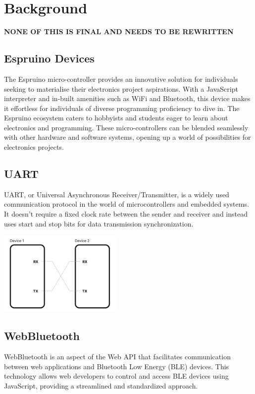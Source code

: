 \documentclass{l4proj}
\begin{document}
\chapter{Background}

\textbf{NONE OF THIS IS FINAL AND NEEDS TO BE REWRITTEN}

\section{Espruino Devices}
\text 
The Espruino micro-controller provides an innovative solution for individuals seeking to materialise their electronics project aspirations. With a JavaScript interpreter and in-built amenities such as WiFi and Bluetooth, this device makes it effortless for individuals of diverse programming proficiency to dive in. The Espruino ecosystem caters to hobbyists and students eager to learn about electronics and programming. These micro-controllers can be blended seamlessly with other hardware and software systems, opening up a world of possibilities for electronics projects.

    
\section{UART}
\text UART, or Universal Asynchronous Receiver/Transmitter, is a widely used communication protocol in the world of microcontrollers and embedded systems. It doesn't require a fixed clock rate between the sender and receiver and instead uses start and stop bits for data transmission synchronization.


\begin{center}
    \includegraphics[width=60mm,scale=0.5]{dissertation/images/UART_diagram.png}
\end{center}




\section{WebBluetooth}
\text WebBluetooth is an aspect of the Web API that facilitates communication between web applications and Bluetooth Low Energy (BLE) devices. This technology allows web developers to control and access BLE devices using JavaScript, providing a streamlined and standardized approach.
\end{document}
